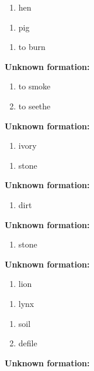 \begin{enumerate}
\item hen
\end{enumerate}
\begin{enumerate}
\item pig
\end{enumerate}
\begin{enumerate}
\item to burn
\end{enumerate}
\noindent\textbf{Unknown formation:}\\

\begin{enumerate}
\item to smoke
\item to seethe
\end{enumerate}
\noindent\textbf{Unknown formation:}\\

\begin{enumerate}
\item ivory
\end{enumerate}
\begin{enumerate}
\item stone
\end{enumerate}
\noindent\textbf{Unknown formation:}\\

\begin{enumerate}
\item dirt
\end{enumerate}
\noindent\textbf{Unknown formation:}\\

\begin{enumerate}
\item stone
\end{enumerate}
\noindent\textbf{Unknown formation:}\\

\begin{enumerate}
\item lion
\end{enumerate}
\begin{enumerate}
\item lynx
\end{enumerate}
\begin{enumerate}
\item soil
\item defile
\end{enumerate}
\noindent\textbf{Unknown formation:}\\

